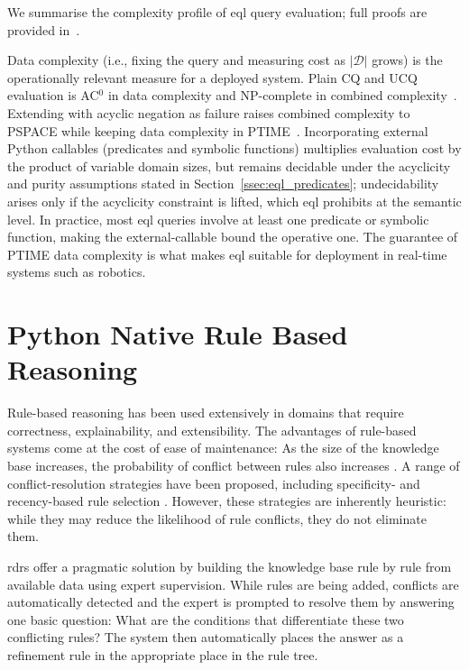 \documentclass{article}
\begin{document}
We summarise the complexity profile of \ac{eql} query evaluation; full proofs
are provided in~\cite{EQLFormalization2026}.

Data complexity (i.e., fixing the query and measuring cost as $|\mathcal{D}|$
grows) is the operationally relevant measure for a deployed system. Plain CQ
and UCQ evaluation is AC$^0$ in data complexity and NP-complete in combined
complexity~\cite{ChandraMerlin1977,Vardi1982,AbiteboulHullVianu1995}. Extending
with acyclic negation as failure raises combined complexity to PSPACE while
keeping data complexity in PTIME~\cite{AptBlairWalker1988}. Incorporating
external Python callables (predicates and symbolic functions) multiplies
evaluation cost by the product of variable domain sizes, but remains decidable
under the acyclicity and purity assumptions stated in
Section~\ref{ssec:eql_predicates}; undecidability arises only if the acyclicity
constraint is lifted, which \ac{eql} prohibits at the semantic level. In
practice, most \ac{eql} queries involve at least one predicate or symbolic
function, making the external-callable bound the operative one. The guarantee
of PTIME data complexity is what makes \ac{eql} suitable for deployment in
real-time systems such as robotics.

\section{Python Native Rule Based Reasoning}
\label{sec:rdrs}
Rule-based reasoning has been used extensively in domains that require correctness, explainability, and extensibility. The advantages of rule-based systems come at the cost of ease of maintenance: As the size of the knowledge base increases, the probability of conflict between rules also increases \cite{compton2021rdr}. A range of conflict-resolution strategies have been proposed, including specificity- and recency-based rule selection \cite{brachman2004knowledge}. However, these strategies are inherently heuristic: while they may reduce the likelihood of rule conflicts, they do not eliminate them.

\ac{rdr}s \cite{compton2021rdr} offer a pragmatic solution by building the knowledge base rule by rule from available data using expert supervision. While rules are being added, conflicts are automatically detected and the expert is prompted to resolve them by answering one basic question: What are the conditions that differentiate these two conflicting rules? The system then automatically places the answer as a refinement rule in the appropriate place in the rule tree.
\end{document}
